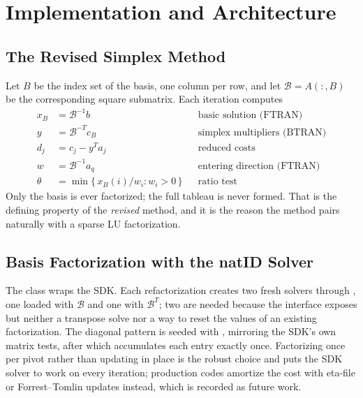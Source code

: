 \documentclass[12pt, a4paper]{article}
\begin{document}
\section{Implementation and Architecture}

\subsection{The Revised Simplex Method}
Let $B$ be the index set of the basis, one column per row, and let $\mathcal{B} = A(:,B)$ be the corresponding square submatrix. Each iteration computes
\[
\begin{aligned}
    x_B &= \mathcal{B}^{-1} b            &&\text{basic solution (FTRAN)}\\
    y   &= \mathcal{B}^{-T} c_B          &&\text{simplex multipliers (BTRAN)}\\
    d_j &= c_j - y^{T} a_j               &&\text{reduced costs}\\
    w   &= \mathcal{B}^{-1} a_q          &&\text{entering direction (FTRAN)}\\
    \theta &= \min \{\, x_B(i)/w_i : w_i > 0 \,\} &&\text{ratio test}
\end{aligned}
\]
Only the basis is ever factorized; the full tableau is never formed. That is the defining property of the \emph{revised} method, and it is the reason the method pairs naturally with a sparse LU factorization.

\subsection{Basis Factorization with the natID Solver}
The class  wraps the SDK. Each refactorization creates two fresh solvers through , one loaded with $\mathcal{B}$ and one with $\mathcal{B}^{T}$; two are needed because the  interface exposes  but neither a transpose solve nor a way to reset the values of an existing factorization. The diagonal pattern is seeded with , mirroring the SDK's own matrix tests, after which  accumulates each entry exactly once. Factorizing once per pivot rather than updating in place is the robust choice and puts the SDK solver to work on every iteration; production codes amortize the cost with eta-file or Forrest--Tomlin updates instead, which is recorded as future work.
\end{document}
